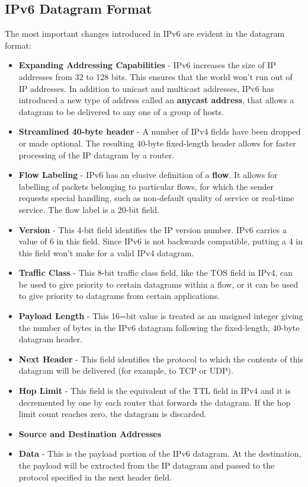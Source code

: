 \subsection{IPv6 Datagram Format}
The most important changes introduced in IPv6 are evident in the datagram format:
\begin{itemize}
\item \textbf{Expanding Addressing Capabilities} - IPv6 increases the size of IP addresses from 32 to 128 bits. This ensures that the world won't run out of IP addresses. In addition to unicast and multicast addresses, IPv6 has introduced a new type of address called an \textbf{anycast address}, that allows a datagram to be delivered to any one of a group of hosts.
\item \textbf{Streamlined 40-byte header} - A number of IPv4 fields have been dropped or made optional. The resulting 40-byte fixed-length header allows for faster processing of the IP datagram by a router.
\item \textbf{Flow Labeling} - IPv6 has an elusive definition of a \textbf{flow}. It allows for labelling of packets belonging to particular flows, for which the sender requests special handling, such as non-default quality of service or real-time service. The flow label is a 20-bit field.
\item \textbf{Version} - This 4-bit field identifies the IP version number. IPv6 carries a value of 6 in this field. Since IPv6 is not backwards compatible, putting a 4 in this field won't make for a valid IPv4 datagram.
\item \textbf{Traffic Class} - This 8-bit traffic class field, like the TOS field in IPv4, can be used to give priority to certain datagrams within a flow, or it can be used to give priority to datagrams from certain applications.
\item \textbf{Payload Length} - This 16=bit value is treated as an unsigned integer giving the number of bytes in the IPv6 datagram following the fixed-length, 40-byte datagram header.
\item \textbf{Next Header} - This field identifies the protocol to which the contents of this datagram will be delivered (for example, to TCP or UDP).
\item \textbf{Hop Limit} - This field is the equivalent of the TTL field in IPv4 and it is decremented by one by each router that forwards the datagram. If the hop limit count reaches zero, the datagram is discarded.
\item \textbf{Source and Destination Addresses}
\item \textbf{Data} - This is the payload portion of the IPv6 datagram. At the destination, the payload will be extracted from the IP datagram and passed to the protocol specified in the next header field.
\end{itemize}
